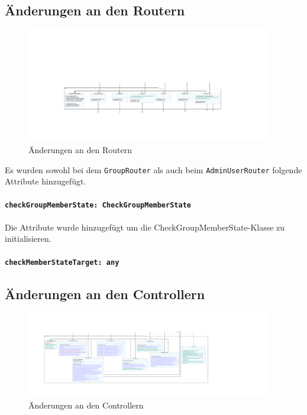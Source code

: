 \documentclass{implementierungsheft}
\begin{document}
\subsection{Änderungen an den Routern}
\begin{figure}[htp]
    \centering
    \includegraphics[width=0.95\textwidth]{images/uml/routers.pdf}
    \caption{Änderungen an den Routern}
    \label{fig:routers}
\end{figure}

Es wurden sowohl bei dem \texttt{GroupRouter} als auch beim \texttt{AdminUserRouter} folgende Attribute hinzugefügt.

\paragraph{\texttt{checkGroupMemberState: CheckGroupMemberState}} Die Attribute wurde hinzugefügt um die CheckGroupMemberState-Klasse zu initialisieren.
\paragraph{\texttt{checkMemberStateTarget: any}} 

\newpage

\subsection{Änderungen an den Controllern}

\begin{figure}[htp]
    \centering
    \includegraphics[width=0.95\textwidth]{images/uml/controller.pdf}
    \caption{Änderungen an den Controllern}
    \label{fig:controller}
\end{figure}
\end{document}
